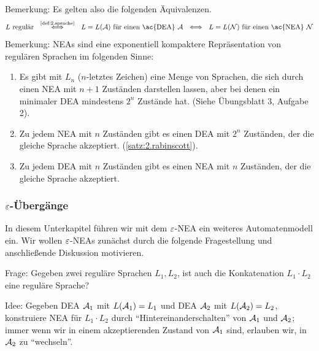 Bemerkung: Es gelten also die folgenden Äquivalenzen.
\[
L \text{ regulär} 
\ \ \stackrel{\text{\autoref{def:2.sprache}}}{\Longleftrightarrow} \ \ L = L(\A) \text{ für einen \ac{DEA} }\A
\ \ \Longleftrightarrow \ \ L = L(\calN) \text{ für einen \ac{NEA} }\calN
\]
Bemerkung: \ac{NEA}s sind eine exponentiell kompaktere Repräsentation von regulären Sprachen im folgenden Sinne:
\begin{enumerate}
 \item Es gibt mit $L_n$ ($n$-letztes Zeichen) eine Menge von Sprachen, die sich durch einen \ac{NEA} mit $n+1$ Zuständen darstellen lassen, aber bei denen ein minimaler \ac{DEA} mindestens $2^n$ Zustände hat. (Siehe Übungsblatt 3, Aufgabe 2).
 \item Zu jedem \ac{NEA} mit $n$ Zuständen gibt es einen \ac{DEA} mit $2^n$ Zuständen, der die gleiche Sprache akzeptiert. (\autoref{satz:2.rabinscott}).
 \item Zu jedem \ac{DEA} mit $n$ Zuständen gibt es einen \ac{NEA} mit $n$ Zuständen, der die gleiche Sprache akzeptiert.
\end{enumerate}

\subsubsection{\texorpdfstring{$\varepsilon$}{epsilon}-Übergänge}\label{sec:2.EpsNea}
In diesem Unterkapitel führen wir mit dem $\varepsilon$-NEA ein weiteres Automatenmodell ein. 
Wir wollen $\varepsilon$-NEAs zunächst durch die folgende Fragestellung und anschließende Diskussion motivieren.

Frage: Gegeben zwei reguläre Sprachen $L_1, L_2$, ist auch die Konkatenation $L_1\cdot L_2$ eine reguläre Sprache?

Idee: Gegeben \acs*{DEA} $\mathcal{A}_1$ mit $L(\mathcal{A}_1)=L_1$ und \acs*{DEA} $\mathcal{A}_2$ mit $L(\mathcal{A}_2)=L_2$,
konstruiere \acs*{NEA} für $L_1\cdot L_2$ durch "`Hintereinanderschalten"' von $\mathcal{A}_1$ und $\mathcal{A}_2$;
immer wenn wir in einem akzeptierenden Zustand von $\mathcal{A}_1$ sind, erlauben wir, in $\mathcal{A}_2$ zu "`wechseln"'.

